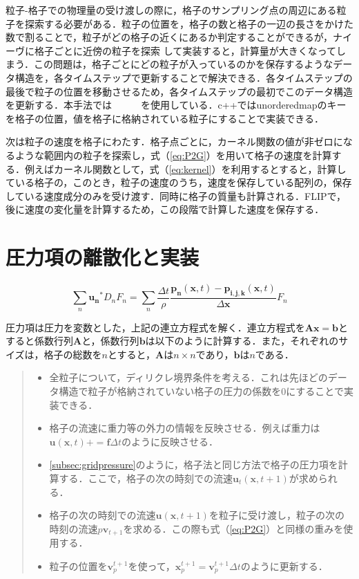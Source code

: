 \documentclass[a4j,12pt]{jreport}
\begin{document}
粒子-格子での物理量の受け渡しの際に，格子のサンプリング点の周辺にある粒子を探索する必要がある．粒子の位置を，格子の数と格子の一辺の長さをかけた数で割ることで，粒子がどの格子の近くにあるか判定することができるが，ナイーヴに格子ごとに近傍の粒子を探索
して実装すると，計算量が大きくなってしまう．この問題は，格子ごとにどの粒子が入っているのかを保存するようなデータ構造を，各タイムステップで更新することで解決できる．各タイムステップの最後で粒子の位置を移動させるため，各タイムステップの最初でこのデータ構造を更新する．本手法では　　　を使用している．c++ではunorderedmapのキーを格子の位置，値を格子に格納されている粒子にすることで実装できる．

次は粒子の速度を格子にわたす．格子点ごとに，カーネル関数の値が非ゼロになるような範囲内の粒子を探索し，式（\ref{eq:P2G}）を用いて格子の速度を計算する．例えばカーネル関数として，式（\ref{eq:kernel}）を利用するとすると，計算している格子の，このとき，粒子の速度のうち，速度を保存している配列の，保存している速度成分のみを受け渡す．同時に格子の質量も計算される．FLIPで，後に速度の変化量を計算するため，この段階で計算した速度を保存する．

\section{圧力項の離散化と実装} \label{sec:Imppressure}
\begin{equation}\label{eq:discretized_pressure}
\sum_{n}\bm{u_n}^*D_nF_n= \sum_{n}\frac{\Delta t}{\rho}\frac{\bm{p_n}(\bm{x},t) - \bm{p_{i,j,k}}(\bm{x},t)}{\Delta \bm{x}}F_n
\end{equation}

圧力項は圧力を変数とした，上記の連立方程式を解く．連立方程式を$\bm{Ax=b}$とすると係数行列$\bm{A}$と，係数行列$\bm{b}$は以下のように計算する．また，それぞれのサイズは，格子の総数を$n$とすると，$\bm{A}$は$n \times n$であり，$\bm{b}$は$n$である．
\begin{quote}
	\begin{itemize}
		\item 全粒子について，ディリクレ境界条件を考える．これは先ほどのデータ構造で粒子が格納されていない格子の圧力の係数を0にすることで実装できる．
		\item 格子の流速に重力等の外力の情報を反映させる．例えば重力は$\bm{u}(\bm{x},t) += \bm{f}\Delta t$のように反映させる．
		\item \ref{subsec:gridpressure}のように，格子法と同じ方法で格子の圧力項を計算する．ここで，格子の次の時刻での流速$\bm{u}_t(\bm{x},t+1)$が求められる．
		\item 格子の次の時刻での流速$\bm{u}(\bm{x},t+1)$を粒子に受け渡し，粒子の次の時刻の流速$p\bm{v}_{t+1}$を求める．この際も式（\ref{eq:P2G}）と同様の重みを使用する．
		\item 粒子の位置を$\bm{v}^{t+1}_p$を使って，$\bm{x}^{t+1}_p = \bm{v}^{t+1}_p\Delta t $のように更新する．
	\end{itemize}
\end{quote}
\end{document}
